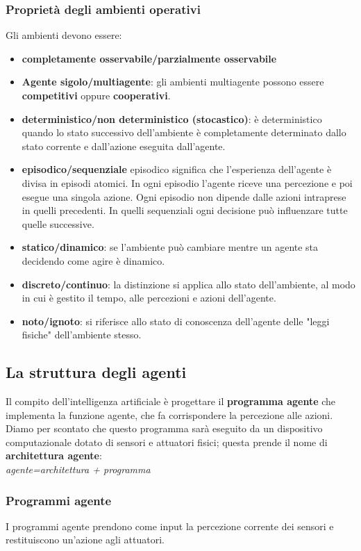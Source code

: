 \documentclass{article}
\begin{document}
\subsubsection{Proprietà degli ambienti operativi}
Gli ambienti devono essere: \begin{itemize}
    \item \textbf{completamente osservabile/parzialmente osservabile}
    \item \textbf{Agente sigolo/multiagente}: gli ambienti multiagente possono essere \textbf{competitivi} oppure \textbf{cooperativi}.
    \item \textbf{deterministico/non deterministico (stocastico)}: è deterministico quando lo stato successivo dell'ambiente è completamente determinato dallo stato corrente e dall'azione eseguita dall'agente.
    \item \textbf{episodico/sequenziale} episodico significa che l'esperienza dell'agente è divisa in episodi atomici. In ogni episodio l'agente riceve una percezione e poi esegue una singola azione. Ogni episodio non dipende dalle azioni intraprese in quelli precedenti. In quelli sequenziali ogni decisione può influenzare tutte quelle successive.
    \item \textbf{statico/dinamico}: se l'ambiente può cambiare mentre un agente sta decidendo come agire è dinamico.
    \item \textbf{discreto/continuo}: la distinzione si applica allo stato dell'ambiente, al modo in cui è gestito il tempo, alle percezioni e azioni dell'agente.
    \item \textbf{noto/ignoto}: si riferisce allo stato di conoscenza dell'agente delle "leggi fisiche" dell'ambiente stesso.
\end{itemize}
\subsection{La struttura degli agenti}
    Il compito dell'intelligenza artificiale è progettare il \textbf{programma agente} che implementa la funzione agente, che fa corrispondere la percezione alle azioni. Diamo per scontato che questo programma sarà eseguito da un dispositivo computazionale dotato di sensori e attuatori fisici; questa prende il nome di \textbf{architettura agente}: \\
    \textit{agente=architettura + programma}
\subsubsection{Programmi agente}
I programmi agente prendono come input la percezione corrente dei sensori e restituiscono un'azione agli attuatori.
\end{document}
